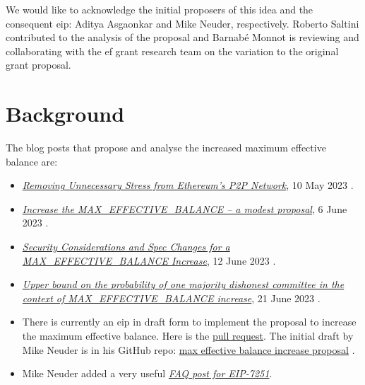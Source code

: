 \documentclass[UTF8]{article}
\begin{document}
We would like to acknowledge the initial proposers of this idea and the consequent \gls{eip}: Aditya Asgaonkar and Mike Neuder, respectively. Roberto Saltini contributed to the analysis of the proposal and Barnab\'e Monnot is reviewing and collaborating with the \gls{ef} grant research team on the variation to the original grant proposal.

\section{Background}
\label{EIP-7251}
The blog posts that propose and analyse the increased maximum effective balance are:
\begin{itemize}
\item \href{https://ethresear.ch/t/removing-unnecessary-stress-from-ethereums-p2p-network/15547}{\textit{Removing Unnecessary Stress from Ethereum’s P2P Network}}, 10 May 2023 \cite{Asgaonkar2023}.
\item \href{https://ethresear.ch/t/increase-the-max-effective-balance-a-modest-proposal/15801/3}{\textit{Increase the MAX\_EFFECTIVE\_BALANCE – a modest proposal}}, 6 June 2023 \cite{Neuder2023a}.
\item \href{https://notes.ethereum.org/nHqON5l7SACkL\_nPwz8Vqw}{\textit{Security Considerations and Spec Changes for a MAX\_EFFECTIVE\_BALANCE Increase}}, 12 June 2023 \cite{Neuder2023b}.

\item \href{https://hackmd.io/@0g8QuqEeQBe45CC8toURGw/HylpAVzIH2}{\textit{Upper bound on the probability of one majority dishonest committee in the context of MAX\_EFFECTIVE\_BALANCE increase}}, 21 June 2023 \cite{Saltini2023}.

\item There is currently an \gls{eip} in draft form to implement the proposal to increase the maximum effective balance. Here is the \href{https://github.com/ethereum/EIPs/pull/7251/commits/ec37fceec914af2a3fd298ef6f6cc13b5d41c533#diff-0e923b63b339f877c14b995b0c69d4962489dce485fb0e31ef49a4dd303e0b56}{pull request}. The initial draft by Mike Neuder is in his GitHub repo: \href{https://github.com/michaelneuder/EIPs/blob/max-eb-increase/EIPS/eip-increase-MaxEB.md}{max effective balance increase proposal} \cite{Neuder2023c}.

\item Mike Neuder added a very useful \href{https://notes.ethereum.org/@mikeneuder/eip-7251-faq}{\textit{FAQ post for EIP-7251}}.


\end{itemize}
\end{document}
